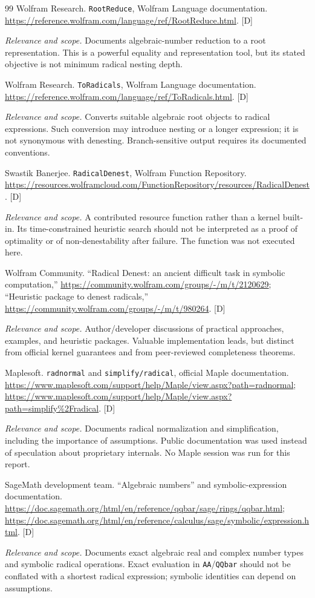 \documentclass[11pt,oneside]{article}
\numberwithin{equation}{section}
\theoremstyle{definition}
\theoremstyle{remark}
\newcommand{\status}[1]{\textsf{\small[#1]}}
\newcommand{\entrynote}[1]{\par\smallskip\noindent\emph{Relevance and scope.} #1}
\begin{document}
\begin{thebibliography}{99}
Wolfram Research. \texttt{RootReduce}, Wolfram Language documentation. \url{https://reference.wolfram.com/language/ref/RootReduce.html}. \status{D}
\entrynote{Documents algebraic-number reduction to a root representation. This is a powerful equality and representation tool, but its stated objective is not minimum radical nesting depth.}

Wolfram Research. \texttt{ToRadicals}, Wolfram Language documentation. \url{https://reference.wolfram.com/language/ref/ToRadicals.html}. \status{D}
\entrynote{Converts suitable algebraic root objects to radical expressions. Such conversion may introduce nesting or a longer expression; it is not synonymous with denesting. Branch-sensitive output requires its documented conventions.}

Swastik Banerjee. \texttt{RadicalDenest}, Wolfram Function Repository. \url{https://resources.wolframcloud.com/FunctionRepository/resources/RadicalDenest}. \status{D}
\entrynote{A contributed resource function rather than a kernel built-in. Its time-constrained heuristic search should not be interpreted as a proof of optimality or of non-denestability after failure. The function was not executed here.}

Wolfram Community. ``Radical Denest: an ancient difficult task in symbolic computation,'' \url{https://community.wolfram.com/groups/-/m/t/2120629}; ``Heuristic package to denest radicals,'' \url{https://community.wolfram.com/groups/-/m/t/980264}. \status{D}
\entrynote{Author/developer discussions of practical approaches, examples, and heuristic packages. Valuable implementation leads, but distinct from official kernel guarantees and from peer-reviewed completeness theorems.}

Maplesoft. \texttt{radnormal} and \texttt{simplify/radical}, official Maple documentation. \url{https://www.maplesoft.com/support/help/Maple/view.aspx?path=radnormal}; \url{https://www.maplesoft.com/support/help/Maple/view.aspx?path=simplify%2Fradical}. \status{D}
\entrynote{Documents radical normalization and simplification, including the importance of assumptions. Public documentation was used instead of speculation about proprietary internals. No Maple session was run for this report.}

SageMath development team. ``Algebraic numbers'' and symbolic-expression documentation. \url{https://doc.sagemath.org/html/en/reference/qqbar/sage/rings/qqbar.html}; \url{https://doc.sagemath.org/html/en/reference/calculus/sage/symbolic/expression.html}. \status{D}
\entrynote{Documents exact algebraic real and complex number types and symbolic radical operations. Exact evaluation in \texttt{AA}/\texttt{QQbar} should not be conflated with a shortest radical expression; symbolic identities can depend on assumptions.}


\end{thebibliography}
\end{document}
